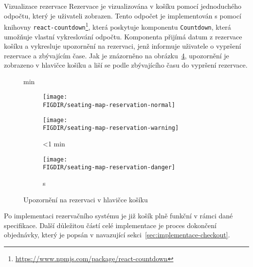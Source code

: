 \begin{subsection}{Vizualizace rezervace}
    \label{subsec:implementace-rezervace-vizualizace}
    Rezervace je vizualizována v košíku pomocí jednoduchého odpočtu, který je uživateli zobrazen.
    Tento odpočet je implementován s pomocí knihovny \texttt{react-countdown}\footnote{\url{https://www.npmjs.com/package/react-countdown}}, která poskytuje komponentu \texttt{Countdown}, která umožňuje vlastní vykreslování odpočtu.
    Komponenta přijímá datum z rezervace košíku a vykresluje upozornění na rezervaci, jenž informuje uživatele o vypršení rezervace a zbývajícím čase.
    Jak je znázorněno na obrázku~\ref{fig:seating-map-reservation}, upozornění je zobrazeno v hlavičce košíku a liší se podle zbývajícího času do vypršení rezervace.

    \begin{figure}[H]
        \centering
        \caption{ min}
        \begin{subfigure}{0.3\textwidth}
            \texttt{[image: \\FIGDIR/seating-map-reservation-normal]}
            \source{}
            \label{fig:seating-map-reservation-normal}
        \end{subfigure}
        \hfill
        \begin{subfigure}{0.3\textwidth}
            \texttt{[image: \\FIGDIR/seating-map-reservation-warning]}
            \caption{\textless 1 min}
            \label{fig:seating-map-reservation-warning}
        \end{subfigure}
        \hfill
        \begin{subfigure}{0.3\textwidth}
            \texttt{[image: \\FIGDIR/seating-map-reservation-danger]}
            \caption{ s}
            \label{fig:seating-map-reservation-danger}
        \end{subfigure}
        \caption{Upozornění na rezervaci v hlavičce košíku}
        \label{fig:seating-map-reservation}
    \end{figure}

    Po implementaci rezervačního systému je již košík plně funkční v rámci dané specifikace.
    Další důležitou částí celé implementace je proces dokončení objednávky, který je popsán v navazující sekci~\ref{sec:implementace-checkout}.
\end{subsection}

